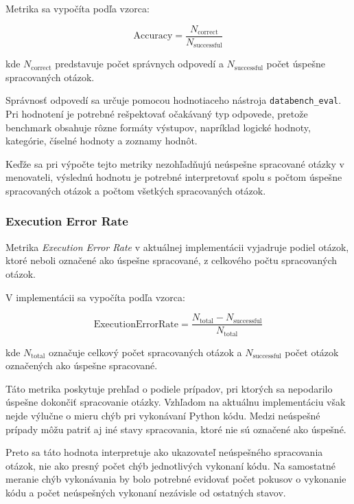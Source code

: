 Metrika sa vypočíta podľa vzorca:

\begin{equation}
\mathrm{Accuracy} =
\frac{N_{\mathrm{correct}}}
{N_{\mathrm{successful}}}
\end{equation}

kde $N_{\mathrm{correct}}$ predstavuje počet správnych odpovedí a
$N_{\mathrm{successful}}$ počet úspešne spracovaných otázok.

Správnosť odpovedí sa určuje pomocou hodnotiaceho nástroja
\texttt{databench\_eval}. Pri hodnotení je potrebné rešpektovať očakávaný typ odpovede, pretože benchmark obsahuje rôzne formáty výstupov, napríklad logické hodnoty, kategórie, číselné hodnoty a zoznamy hodnôt.

Keďže sa pri výpočte tejto metriky nezohľadňujú neúspešne spracované otázky v menovateli, výslednú hodnotu je potrebné interpretovať spolu s počtom úspešne spracovaných otázok a počtom všetkých spracovaných otázok.

\subsubsection{Execution Error Rate}

Metrika \textit{Execution Error Rate} v aktuálnej implementácii vyjadruje podiel otázok, ktoré neboli označené ako úspešne spracované, z celkového počtu spracovaných otázok.

V implementácii sa vypočíta podľa vzorca:

\begin{equation}
\mathrm{ExecutionErrorRate} =
\frac{N_{\mathrm{total}} - N_{\mathrm{successful}}}
{N_{\mathrm{total}}}
\end{equation}

kde $N_{\mathrm{total}}$ označuje celkový počet spracovaných otázok a
$N_{\mathrm{successful}}$ počet otázok označených ako úspešne spracované.

Táto metrika poskytuje prehľad o podiele prípadov, pri ktorých sa nepodarilo úspešne dokončiť spracovanie otázky. Vzhľadom na aktuálnu implementáciu však nejde výlučne o mieru chýb pri vykonávaní Python kódu. Medzi neúspešné prípady môžu patriť aj iné stavy spracovania, ktoré nie sú označené ako úspešné.

Preto sa táto hodnota interpretuje ako ukazovateľ neúspešného spracovania otázok, nie ako presný počet chýb jednotlivých vykonaní kódu. Na samostatné meranie chýb vykonávania by bolo potrebné evidovať počet pokusov o vykonanie kódu a počet neúspešných vykonaní nezávisle od ostatných stavov.

